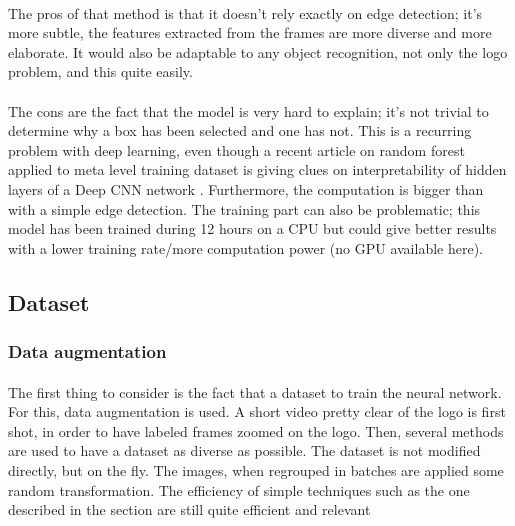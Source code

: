 \documentclass[12pt]{article}%
\begin{document}
\paragraph{}
The pros of that method is that it doesn't rely exactly on edge detection; it's more subtle, the features extracted from the frames are more diverse and more elaborate. It would also be adaptable to any object recognition, not only the logo problem, and this quite easily.

\paragraph{}
The cons are the fact that the model is very hard to explain; it's not trivial to determine why a box has been selected and one has not. This is a recurring problem with deep learning, even though a recent article on random forest applied to meta level training dataset is giving clues on interpretability  of hidden layers of a Deep CNN network \cite{interpretability}. Furthermore, the computation is bigger than with a simple edge detection. The training part can also be problematic; this model has been trained during 12 hours on a CPU but could give better results with a lower training rate/more computation power (no GPU available here).



\subsection{Dataset}

\subsubsection{Data augmentation}

\paragraph{}
The first thing to consider is the fact that a dataset to train the neural network. For this, data augmentation is used. A short video pretty clear of the logo is first shot, in order to have labeled frames zoomed on the logo. Then, several methods are used to have a dataset as diverse as possible. The dataset is not modified directly, but on the fly. The images, when regrouped in batches are applied some random transformation. The efficiency of simple techniques such as the one described in the section are still quite efficient and relevant \cite{dataAugmentation} 
\end{document}
